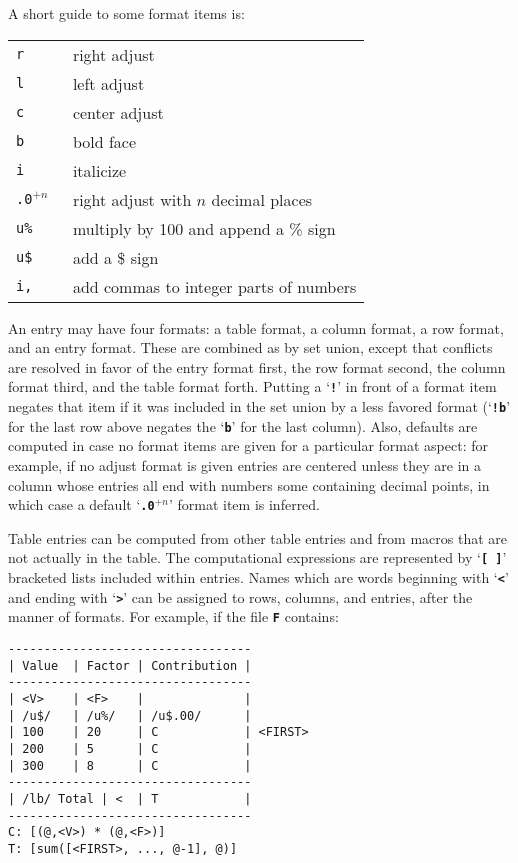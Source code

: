 \documentclass[12pt]{article}
\newcommand{\TT}[1]{{\tt \bfseries #1}}
\newcommand{\PLUS}[1][]{{$^{+#1}$}}
\newenvironment{indpar}[1][0.3in]%
	{\begin{list}{}%
		     {\setlength{\itemsep}{0in}%
		      \setlength{\topsep}{0in}%
		      \setlength{\parsep}{1ex}%
		      \setlength{\labelwidth}{#1}%
		      \setlength{\leftmargin}{#1}%
		      \addtolength{\leftmargin}{\labelsep}}%
	 \item}%
	{\end{list}}
\begin{document}
A short guide to some format items is:
\begin{indpar}[1in]
\begin{tabular}{ll}
\tt r & right adjust \\
\tt l & left adjust \\
\tt c & center adjust \\
\tt b & bold face \\
\tt i & italicize \\
\tt .0\PLUS[n]{} & right adjust with $n$ decimal places \\
\tt u\% & multiply by 100 and append a \% sign \\
\tt u\$ & add a \$ sign \\
\tt i, & add commas to integer parts of numbers \\
\end{tabular}
\end{indpar}

An entry may have four formats: a table format,
a column format, a row format, and
an entry format.  These are combined as by set union, except that
conflicts are resolved in favor of the entry format first, the
row format second, the column format third, and the table format
forth.
Putting a `\TT{!}' in front of a format item negates
that item if it was included in the set union by
a less favored format (`\TT{!b}' for the last row above negates the `\TT{b}'
for the last column).
Also, defaults are computed in case no format items are
given for a particular format aspect: for example, if no adjust
format is given entries are centered unless they are in a column
whose entries all end with numbers some containing decimal points, in which
case a default `\TT{.0\PLUS[n]{}}' format item is inferred.

Table entries can be computed from other table entries and from macros
that are not actually in the table.  The computational expressions
are represented by `\TT{[~]}' bracketed lists included within entries.
Names which are words beginning with `\TT{<}' and ending with `\TT{>}'
can be assigned to rows, columns, and entries, after the manner of formats.
For example, if the file \TT{F} contains:
\begin{indpar}\begin{verbatim}
----------------------------------
| Value  | Factor | Contribution |
----------------------------------
| <V>    | <F>    |              |
| /u$/   | /u%/   | /u$.00/      |
| 100    | 20     | C            | <FIRST>
| 200    | 5      | C            |
| 300    | 8      | C            |
----------------------------------
| /lb/ Total | <  | T            |
----------------------------------
C: [(@,<V>) * (@,<F>)]
T: [sum([<FIRST>, ..., @-1], @)] 
\end{verbatim}\end{indpar}
\end{document}
